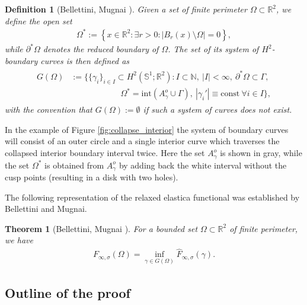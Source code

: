 \documentclass[11pt]{article}
\newcounter{statement}
\numberwithin{statement}{section}
\numberwithin{equation}{section}
\newtheorem{Def}[statement]{Definition}
\newtheorem{thm}[statement]{Theorem}
\theoremstyle{remark}
\newcommand{\R}{\mathbb R} 				%
\newcommand{\N}{\mathbb N}
\newcommand{\Sph}{{\mathbb S}}				%
\begin{document}
\begin{Def}[Bellettini, Mugnai \cite{belletini2004characterization}]
  Given a set of finite perimeter $\Omega \subset \R^2$, we define
  the open set
\begin{align}
    \label{eq:Omstar}
  \Omega^* := \left\{ x\in \R^2 : \exists r>0 : | B_r(x) \setminus
  \Omega |=0 \right\}, 
\end{align}
while $\partial^*\Omega$ denotes the reduced boundary of $\Omega$.
The set of its system of $H^2$-boundary curves is then
  defined as
\begin{align}
  \begin{split}
    G(\Omega) & := \Big\{ \{\gamma_i\}_{i\in I} \subset H^2( \Sph^1
    ;\R^2): I \subset \N, \ |I| < \infty,
    \ \partial^* \Omega \subset \Gamma, \\
    & \qquad \qquad \qquad \Omega^*= \mathrm{int}\left(A_\gamma^o \cup
      \Gamma \right) ,\ |\gamma_i'| \equiv \text{const} \ \forall
    i \in I \Big\} ,
  \end{split}
\end{align}
with the convention that $G(\Omega) := \emptyset$ if such a system
  of curves does not exist.
\end{Def}
\noindent In the example of Figure \ref{fig:collapse_interior} the
  system of boundary curves will consist of an outer circle and a
  single interior curve which traverses the collapsed interior
  boundary interval twice. Here the set $A_\gamma^o$ is shown in gray,
  while the set $\Omega^*$ is obtained from $A_\gamma^o$ by adding
  back the white interval without the cusp points (resulting in a disk
  with two holes).

  The following representation of the relaxed elastica functional
  was established by Bellettini and Mugnai.


  \begin{thm}[Bellettini, Mugnai
    \cite{belletini2004characterization}]\label{thm:relaxation}
  For a bounded set $\Omega \subset \R^2$ of finite perimeter, we have
	\begin{align}
          F_{\infty,\sigma}(\Omega) = \inf_{\gamma \in G(\Omega)} \hat
          F_{\infty,\sigma}(\gamma). 
	\end{align}
\end{thm}

\subsection{Outline of the proof}
\end{document}
